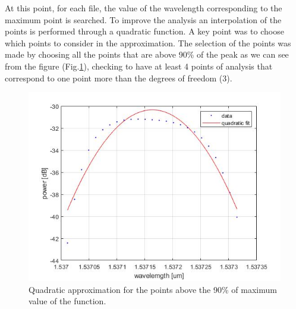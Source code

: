 At this point, for each file, the value of the wavelength corresponding to the maximum point is searched. To improve the analysis an interpolation of the points is performed through a quadratic function. A key point was to choose which points to consider in the approximation.
The selection of the points was made by choosing all the points that are above 90\% of the peak as we can see from the figure (Fig.\ref{fig:peak}), checking to have at least 4 points of analysis that correspond to one point more than the degrees of freedom (3).
\begin{figure}[h]
    \centering
    \includegraphics[scale=0.7]{img/peak.jpg}
    \caption{Quadratic approximation for the points above the 90\% of maximum value of the function.}
    \label{fig:peak}
\end{figure}

